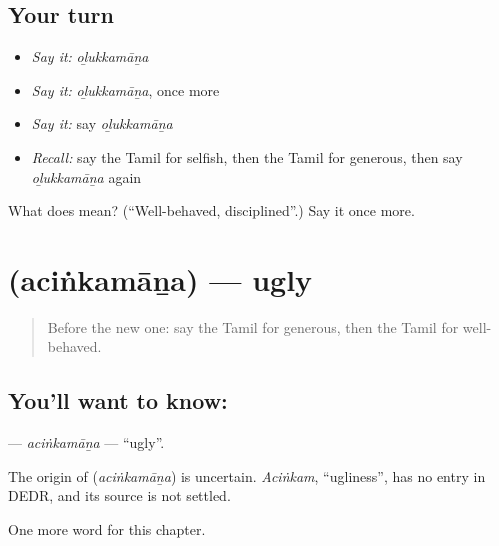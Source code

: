 \subsection*{Your turn}
\begin{itemize}
\raggedright
  \item \emph{Say it:} \emph{oḻukkamāṉa}
  \item \emph{Say it:} \emph{oḻukkamāṉa}, once more
  \item \emph{Say it:} say \emph{oḻukkamāṉa}
  \item \emph{Recall:} say the Tamil for selfish, then the Tamil for generous, then say \emph{oḻukkamāṉa} again
\end{itemize}

\begin{tcolorbox}[breakable,colback=teal!4,colframe=teal!35!black,title={Before you move on}]
What does  mean? (\textquotedblleft{}Well-behaved, disciplined\textquotedblright{}.) Say it once more.
\end{tcolorbox}
\section[\texorpdfstring{\ta{அசிங்கமான} (aciṅkamāṉa)}{அசிங்கமான (aciṅkamāṉa)}]{ (aciṅkamāṉa) — ugly}

\label{lesson:TA-C212-acinkamana}



\begin{quote}
Before the new one: say the Tamil for generous, then the Tamil for well-behaved.
\end{quote}

\subsection*{You'll want to know: }
\textbf{} — \emph{aciṅkamāṉa} — \textquotedblleft{}ugly\textquotedblright{}.

\begin{cousinweb}
The origin of \textbf{} (\emph{aciṅkamāṉa}) is uncertain. \emph{Aciṅkam}, \textquotedblleft{}ugliness\textquotedblright{}, has no entry in DEDR, and its source is not settled.
\end{cousinweb}

\begin{grammarlens}[title={What you've built}]
One more word for this chapter.
\end{grammarlens}

